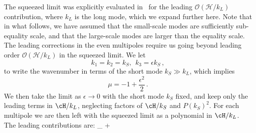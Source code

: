 The squeezed limit was explicitly evaluated in~\cite{Clarkson:2018dwn} for the leading $\mathcal{O}(\mathcal{H}/k_L)$ contribution, where $k_L$ is the long mode, which we expand further here. {Note that in what follows, we have assumed that the small-scale modes are sufficiently sub-equality scale, and that the large-scale modes are larger than the equality scale. The leading corrections in the even multipoles require us going beyond leading order $\mathcal{O}(\mathcal{H}/k_L)$ in the squeezed limit. We let 
\begin{equation}
k_{1}=k_{2}=k_S, ~~k_{3}=\epsilon k_S\,,
\end{equation}
to write the wavenumber in terms of the short mode $k_S\gg k_L$, which implies
\begin{equation}
\mu=-1+\frac{\epsilon^2}{2}\,.
\end{equation}
We then take the limit as $\epsilon\to0$ with the short mode $k_S$ fixed, and keep only the leading terms in $\cH/k_L$, neglecting factors of $\cH/k_S$ and $P(k_S)^2$.  For each multipole we are then left with the squeezed limit as a polynomial in $\cH/k_L$. The leading contributions are:
\be
{}_{}
+
\underbrace{
}}
